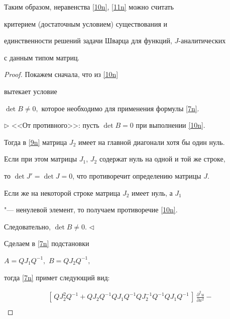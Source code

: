 Таким образом, неравенства \eqref{10n}, \eqref{11n} можно считать

критерием (достаточным условием) существования и

единственности  решений задачи Шварца для функций, $J$-аналитических

с данным типом  матриц.



\smallskip



\begin{proof}  Покажем сначала, что из \eqref{10n}

вытекает условие

 $\det B\ne 0,$ которое необходимо для применения формулы \eqref{7n}.



\smallskip



 $\triangleright$ <<От противного>>: пусть $\det B=0$ при выполнении \eqref{10n}.

Тогда в \eqref{9n} матрица $J_2$ имеет на главной диагонали хотя бы один нуль.

Если  при этом матрицы $J_1$, $J_2$ содержат нуль на одной и той же строке,

то \mbox{$\det J'=\det J=0$}, что противоречит определению  матрицы $J$.

 Если же на некоторой строке матрица $J_2$ имеет нуль, а $J_1$

 "--- ненулевой элемент, то получаем противоречие \eqref{10n}.

 Следовательно,  $\det B\ne 0$. $\triangleleft$



\smallskip





Сделаем в \eqref{7n} подстановки

$A=QJ_1Q^{-1},$ $B=QJ_2Q^{-1},$

тогда \eqref{7n} примет следующий вид:

\begin{multline}

\left[\,QJ_2^2Q^{-1}+QJ_2Q^{-1}QJ_1Q^{-1}QJ_2^{-1}Q^{-1}QJ_1Q^{-1}\,\right]

\,\frac{\partial^2 u}{\partial x^2}-

\\


\end{multline}
\end{proof}
